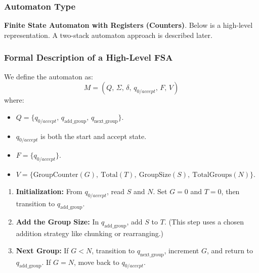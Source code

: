 \documentclass[11pt]{article}
\begin{document}
\subsubsection*{Automaton Type}
\textbf{Finite State Automaton with Registers (Counters)}. Below is a high-level representation. A two-stack automaton approach is described later.

\subsubsection*{Formal Description of a High-Level FSA}

We define the automaton as:
\[
M = (Q,\, \Sigma,\, \delta,\, q_{0/accept},\, F,\, V)
\]
where:
\begin{itemize}
    \item \(Q = \{q_{0/accept},\, q_{\text{add\_group}},\, q_{\text{next\_group}}\}\).
    \item \(q_{0/accept}\) is both the start and accept state.
    \item \(F = \{q_{0/accept}\}\).
    \item \(V = \{\text{GroupCounter}(G),\ \text{Total}(T),\ \text{GroupSize}(S),\ \text{TotalGroups}(N)\}\).
\end{itemize}

\begin{enumerate}
    \item \textbf{Initialization:} From \(q_{0/accept}\), read \(S\) and \(N\). Set \(G=0\) and \(T=0\), then transition to \(q_{\text{add\_group}}\).
    \item \textbf{Add the Group Size:} In \(q_{\text{add\_group}}\), add \(S\) to \(T\). (This step uses a chosen addition strategy like chunking or rearranging.)
    \item \textbf{Next Group:} If \(G < N\), transition to \(q_{\text{next\_group}}\), increment \(G\), and return to \(q_{\text{add\_group}}\). If \(G = N\), move back to \(q_{0/accept}\).
\end{enumerate}
\end{document}
